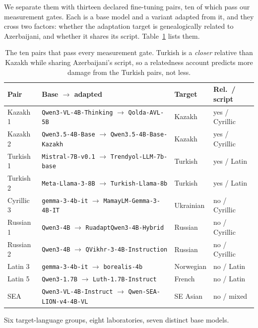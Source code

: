 \documentclass[final]{clv2025}
\begin{document}
We separate them with thirteen declared fine-tuning pairs, ten of which pass our
measurement gates. Each is a base model and a variant adapted from it, and they
cross two factors: whether the adaptation target is genealogically related to
Azerbaijani, and whether it shares its script. Table~\ref{tab:pairs-design}
lists them.

\begin{table}[h!]
\caption{The ten pairs that pass every measurement gate. Turkish is a
\emph{closer} relative than Kazakh while sharing Azerbaijani's script, so a
relatedness account predicts more damage from the Turkish pairs, not less.}
\label{tab:pairs-design}
\centering
\footnotesize
\begin{tabular}{llll}
\toprule
Pair & Base $\rightarrow$ adapted & Target & Rel.\ / script \\
\midrule
Kazakh 1 & \texttt{Qwen3-VL-4B-Thinking} $\rightarrow$ \texttt{Qolda-AVL-5B} & Kazakh & yes / Cyrillic \\
Kazakh 2 & \texttt{Qwen3.5-4B-Base} $\rightarrow$ \texttt{Qwen3.5-4B-Base-Kazakh} & Kazakh & yes / Cyrillic \\
Turkish 1 & \texttt{Mistral-7B-v0.1} $\rightarrow$ \texttt{Trendyol-LLM-7b-base} & Turkish & yes / Latin \\
Turkish 2 & \texttt{Meta-Llama-3-8B} $\rightarrow$ \texttt{Turkish-Llama-8b} & Turkish & yes / Latin \\
Cyrillic 3 & \texttt{gemma-3-4b-it} $\rightarrow$ \texttt{MamayLM-Gemma-3-4B-IT} & Ukrainian & no / Cyrillic \\
Russian 1 & \texttt{Qwen3-4B} $\rightarrow$ \texttt{RuadaptQwen3-4B-Hybrid} & Russian & no / Cyrillic \\
Russian 2 & \texttt{Qwen3-4B} $\rightarrow$ \texttt{QVikhr-3-4B-Instruction} & Russian & no / Cyrillic \\
Latin 3 & \texttt{gemma-3-4b-it} $\rightarrow$ \texttt{borealis-4b} & Norwegian & no / Latin \\
Latin 5 & \texttt{Qwen3-1.7B} $\rightarrow$ \texttt{Luth-1.7B-Instruct} & French & no / Latin \\
SEA & \texttt{Qwen3-VL-4B-Instruct} $\rightarrow$ \texttt{Qwen-SEA-LION-v4-4B-VL} & SE Asian & no / mixed \\
\bottomrule
\end{tabular}
\end{table}

Six target-language groups, eight laboratories, seven distinct base models.
\end{document}
